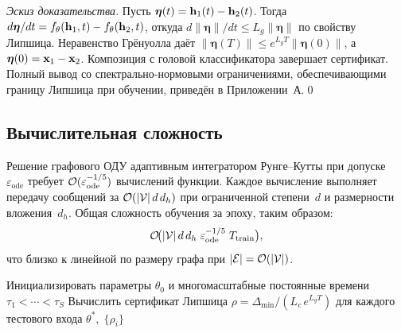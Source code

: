 \noindent\textit{Эскиз доказательства.} Пусть $\bm{\eta}(t)=\mathbf{h}_1(t)-\mathbf{h}_2(t)$. Тогда $d\bm{\eta}/dt = f_\theta(\mathbf{h}_1,t)-f_\theta(\mathbf{h}_2,t)$, откуда $d\|\bm{\eta}\|/dt\le L_g\|\bm{\eta}\|$ по свойству Липшица. Неравенство Грёнуолла даёт $\|\bm{\eta}(T)\|\le e^{L_g T}\|\bm{\eta}(0)\|$, а $\bm{\eta}(0)=\mathbf{x}_1-\mathbf{x}_2$. Композиция с головой классификатора завершает сертификат. Полный вывод со спектрально-нормовыми ограничениями, обеспечивающими границу Липшица при обучении, приведён в Приложении~А.\qed

\subsection{Вычислительная сложность}

Решение графового ОДУ адаптивным интегратором Рунге--Кутты при допуске~$\varepsilon_{\mathrm{ode}}$ требует $\mathcal{O}(\varepsilon_{\mathrm{ode}}^{-1/5})$ вычислений функции. Каждое вычисление выполняет передачу сообщений за $\mathcal{O}(|\mathcal{V}|\,d\,d_h)$ при ограниченной степени~$d$ и размерности вложения~$d_h$. Общая сложность обучения за эпоху, таким образом:
\begin{equation}
\mathcal{O}\!\bigl(|\mathcal{V}|\,d\,d_h\;\varepsilon_{\mathrm{ode}}^{-1/5}\;T_{\mathrm{train}}\bigr),
\label{eq:ct_tgnn_complex}
\end{equation}
что близко к линейной по размеру графа при $|\mathcal{E}|=\mathcal{O}(|\mathcal{V}|)$.

\begin{algorithm}[htbp]
\caption{Обучение CT-TGNN с методом сопряжённых чувствительностей}\label{alg:ct_tgnn}
Инициализировать параметры $\theta_0$ и многомасштабные постоянные времени $\tau_1<\cdots<\tau_S$\;
Вычислить сертификат Липшица $\rho = \Delta_{\min}/(L_c\,e^{L_g T})$ для каждого тестового входа\;
\Return $\theta^*,\;\{\rho_i\}$
\end{algorithm}


